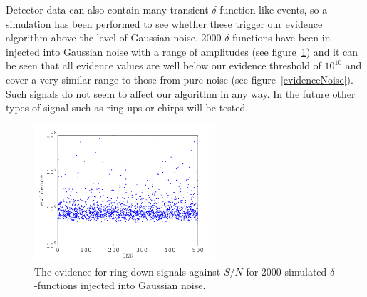 Detector data can also contain many transient $\delta$-function like events, so a simulation has
been performed to see whether these trigger our evidence algorithm above the level of Gaussian
noise. 2000 $\delta$-functions have been in injected into Gaussian noise with a range of amplitudes
(see figure~\ref{evidenceVsSNRForDelta}) and it can be seen that all evidence values are well
below our evidence threshold of $10^{10}$ and cover a very similar range to those from pure noise
(see figure~\ref{evidenceNoise}). Such signals do not seem to affect our algorithm in any way. In
the future other types of signal such as ring-ups or chirps will be tested.
\begin{figure}[!htbp]
\begin{center}
\includegraphics[width=0.6\textwidth]{figs/evidenceVsSNRForDelta}\caption{The evidence for ring-down
signals against $S/N$ for 2000 simulated $\delta$-functions injected into Gaussian
noise.}\label{evidenceVsSNRForDelta}
\end{center}
\end{figure}

